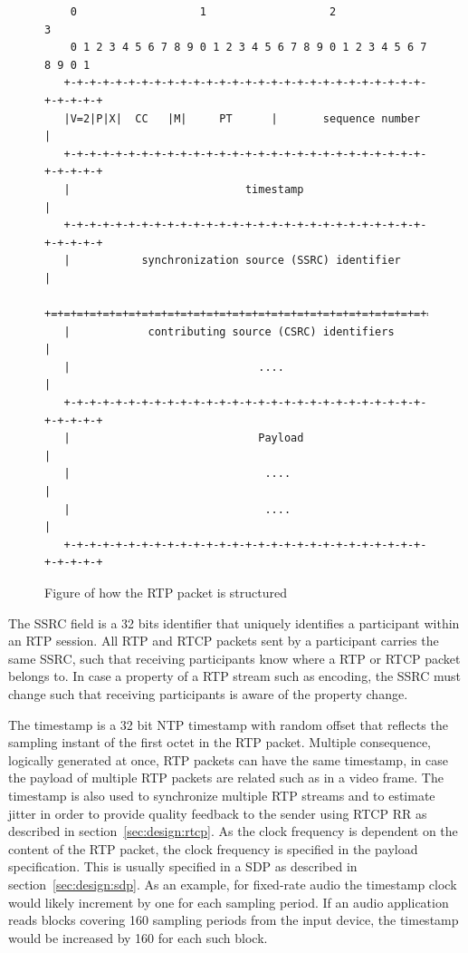 \begin{figure}[H]
\centering
\begin{verbatim}
    0                   1                   2                   3
    0 1 2 3 4 5 6 7 8 9 0 1 2 3 4 5 6 7 8 9 0 1 2 3 4 5 6 7 8 9 0 1
   +-+-+-+-+-+-+-+-+-+-+-+-+-+-+-+-+-+-+-+-+-+-+-+-+-+-+-+-+-+-+-+-+
   |V=2|P|X|  CC   |M|     PT      |       sequence number         |
   +-+-+-+-+-+-+-+-+-+-+-+-+-+-+-+-+-+-+-+-+-+-+-+-+-+-+-+-+-+-+-+-+
   |                           timestamp                           |
   +-+-+-+-+-+-+-+-+-+-+-+-+-+-+-+-+-+-+-+-+-+-+-+-+-+-+-+-+-+-+-+-+
   |           synchronization source (SSRC) identifier            |
   +=+=+=+=+=+=+=+=+=+=+=+=+=+=+=+=+=+=+=+=+=+=+=+=+=+=+=+=+=+=+=+=+
   |            contributing source (CSRC) identifiers             |
   |                             ....                              |
   +-+-+-+-+-+-+-+-+-+-+-+-+-+-+-+-+-+-+-+-+-+-+-+-+-+-+-+-+-+-+-+-+
   |                             Payload                           |
   |                              ....                             |
   |                              ....                             |
   +-+-+-+-+-+-+-+-+-+-+-+-+-+-+-+-+-+-+-+-+-+-+-+-+-+-+-+-+-+-+-+-+
\end{verbatim}
\caption{Figure of how the RTP packet is structured\citep{RFC3550}}
\label{fig:design:rtppacket}
\end{figure}

The \ac{SSRC} field is a 32 bits identifier that uniquely identifies a participant within an RTP session. All RTP and RTCP packets sent by a participant carries the same SSRC, such that receiving participants know where a RTP or RTCP packet belongs to. In case a property of a RTP stream such as encoding, the SSRC must change such that receiving participants is aware of the property change.

The timestamp is a 32 bit NTP timestamp with random offset that reflects the sampling instant of the first octet in the RTP packet. Multiple consequence, logically generated at once, RTP packets can have the same timestamp, in case the payload of multiple RTP packets are related such as in a video frame.
The timestamp is also used to synchronize multiple RTP streams and to estimate jitter in order to provide quality feedback to the sender using RTCP RR as described in section~\ref{sec:design:rtcp}.
As the clock frequency is dependent on the content of the RTP packet, the clock frequency is specified in the payload specification. This is usually specified in a SDP as described in section~\ref{sec:design:sdp}. As an example, for fixed-rate audio the timestamp clock would likely increment by one for each sampling period. If an audio application reads blocks covering 160 sampling periods from the input device, the timestamp would be increased by 160 for each such block\citep{RFC3550}.

